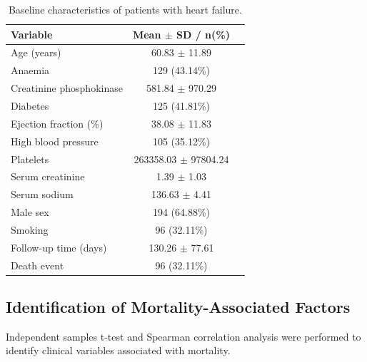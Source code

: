 \documentclass[11pt]{article}
\begin{document}
\begin{table}[H]
\centering
\caption{
Baseline characteristics of patients with heart failure.
}
\label{tab:baseline}

\begin{tabular}{lcc}
\toprule
Variable & Mean $\pm$ SD / n(\%) \\
\midrule

Age (years) & 60.83 $\pm$ 11.89 \\

Anaemia & 129 (43.14\%) \\

Creatinine phosphokinase & 581.84 $\pm$ 970.29 \\

Diabetes & 125 (41.81\%) \\

Ejection fraction (\%) & 38.08 $\pm$ 11.83 \\

High blood pressure & 105 (35.12\%) \\

Platelets & 263358.03 $\pm$ 97804.24 \\

Serum creatinine & 1.39 $\pm$ 1.03 \\

Serum sodium & 136.63 $\pm$ 4.41 \\

Male sex & 194 (64.88\%) \\

Smoking & 96 (32.11\%) \\

Follow-up time (days) & 130.26 $\pm$ 77.61 \\

Death event & 96 (32.11\%) \\

\bottomrule
\end{tabular}

\end{table}




\subsection{Identification of Mortality-Associated Factors}


Independent samples t-test and Spearman correlation analysis were performed
to identify clinical variables associated with mortality.
\end{document}
